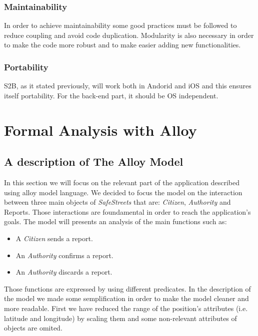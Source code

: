 \documentclass{article}
\begin{document}
\subsubsection{Maintainability}
In order to achieve maintainability some good practices must be followed to reduce coupling and avoid code duplication.
Modularity is also necessary in order to make the code more robust and to make easier adding new functionalities.

\subsubsection{Portability}
S2B, as it stated previously, will work both in Andorid and iOS and this ensures itself portability. For 
the back-end part, it should be OS independent.

\clearpage


\section{Formal Analysis with Alloy}

\subsection{A description of The Alloy Model}
In this section we will focus on the relevant part of the application described
using alloy model language. We decided to
focus the model on the interaction between three main objects of 
\textit{SafeStreets} that are: \textit{Citizen}, \textit{Authority} and Reports. 
Those interactions are foundamental in order to reach the application's goals. 
The model will presents an analysis of the main functions such as:
\begin{itemize}
    \item A \textit{Citizen} sends a report. 
    \item An \textit{Authority} confirms a report. 
    \item An \textit{Authority} discards a report.
\end{itemize}
Those functions are expressed by using different predicates. In 
the description of the model we made some semplification in order to
make the model cleaner and more readable. First we have reduced the range
of the position's attributes (i.e. latitude and longitude) by scaling them and 
some non-relevant attributes of objects are omited. 

\clearpage
\end{document}
